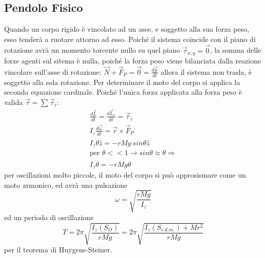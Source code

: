\documentclass{article}
\numberwithin{equation}{subsection}
\begin{document}
\subsection{Pendolo Fisico}
Quando un corpo rigido è vincolato ad un asse, e soggetto 
alla sua forza peso, esso tenderà a ruotare attorno ad esso. 
Poiché il sistema coincide con il piano di rotazione avrà 
un momento torcente nullo su quel piano $\vec{\tau}_{x,y}=\vec{0}$, 
la somma delle forze agenti sul sitema è nulla, poiché 
la forza peso viene bilanciata dalla reazione vincolare sull'asse 
di rotazione: $\vec{N}+\vec{F}_P=\vec{0}=\displaystyle\frac{d\vec{p}}{dt}$ 
allora il sistema non trasla, è soggetto alla sola rotazione. 
Per determinare il moto del corpo si applica la seconda 
equazione cardinale. Poiché l'unica forza applicata alla forza 
peso è valida $\vec{\tau}=\sum\vec{\tau}_i$:
\begin{gather}
    \displaystyle\frac{d\vec{L}}{dt}=\frac{d\vec{L}_z}{dt}=\vec{\tau}_z\\
    I_z\displaystyle\frac{d\vec{\omega}}{dt}=\vec{r}\times\vec{F}_P\\
    I_z\ddot\theta\hat{z}=-rMg\:sin\theta\hat{z}\\
    \mbox{per }\theta<<1\rightarrow sin\theta\approx\theta\Rightarrow\\
    I_z\ddot\theta=-rMg\theta
\end{gather}
per oscillazioni molto piccole, il moto del corpo si può 
approsismare come un moto armonico, ed avrà una pulsazione 
\begin{equation}
    \omega=\displaystyle\sqrt{\displaystyle\frac{rMg}{I_z}}
\end{equation}
ed un periodo di oscillazione 
\begin{equation}
    T=2\pi\displaystyle\sqrt{\frac{I_z(S_O)}{rMg}}=2\pi\sqrt{\frac{I_z(S_{c.d.m.})+Mr^2}{rMg}}
\end{equation}
per il teorema di Huygens-Steiner.

\begin{center}\end{center}
\end{document}

